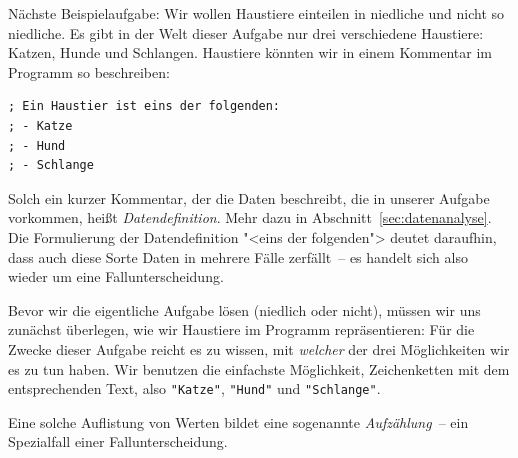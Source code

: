 %
Nächste Beispielaufgabe: Wir wollen Haustiere einteilen in niedliche
und nicht so niedliche.  Es gibt in der Welt dieser Aufgabe nur drei
verschiedene Haustiere: Katzen, Hunde und Schlangen.  Haustiere
könnten wir in einem Kommentar im Programm so beschreiben:
%
\label{sec:datendefinition}
\begin{lstlisting}
; Ein Haustier ist eins der folgenden:
; - Katze
; - Hund
; - Schlange
\end{lstlisting}
%
Solch ein kurzer Kommentar, der die Daten beschreibt, die in unserer
Aufgabe vorkommen, heißt
\textit{Datendefinition}.  Mehr dazu in
Abschnitt~\ref{sec:datenanalyse}.  Die Formulierung der
Datendefinition "<eins der folgenden"> deutet daraufhin, dass auch
diese Sorte Daten in mehrere Fälle zerfällt~-- es handelt sich also
wieder um eine Fallunterscheidung.

Bevor wir die eigentliche Aufgabe lösen (niedlich oder nicht), müssen
wir uns zunächst überlegen, wie wir Haustiere im Programm
repräsentieren: Für die Zwecke dieser Aufgabe reicht es zu wissen, mit
\emph{welcher} der drei Möglichkeiten wir es zu tun haben.  Wir
benutzen die einfachste Möglichkeit, Zeichenketten mit dem
entsprechenden Text, also \lstinline{"Katze"}, \lstinline{"Hund"} und
\lstinline{"Schlange"}.

Eine solche Auflistung von Werten bildet eine sogenannte
\textit{Aufzählung}~-- ein Spezialfall einer
Fallunterscheidung.

